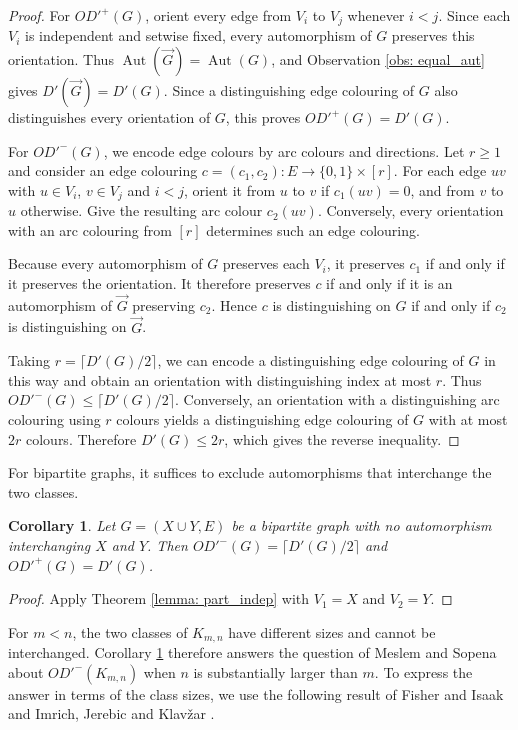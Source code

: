 \documentclass[a4paper,12pt]{elsarticle}
\newtheorem{corollary}[theorem]{Corollary}
\newcommand{\Aut}{\ensuremath{\operatorname{Aut}}}
\newcommand{\orG}{\ensuremath{\overrightarrow{G}}}
\begin{document}
\begin{proof}
For $OD'^+(G)$, orient every edge from $V_i$ to $V_j$ whenever $i<j$. Since each $V_i$ is independent and setwise fixed, every automorphism of $G$ preserves this orientation. Thus $\Aut(\orG)=\Aut(G)$, and Observation \ref{obs: equal_aut} gives $D'(\orG)=D'(G)$. Since a distinguishing edge colouring of $G$ also distinguishes every orientation of $G$, this proves $OD'^+(G)=D'(G)$.

For $OD'^-(G)$, we encode edge colours by arc colours and directions. Let $r\geq 1$ and consider an edge colouring $c=(c_1,c_2)\colon E\to\{0,1\}\times[r]$. For each edge $uv$ with $u\in V_i$, $v\in V_j$ and $i<j$, orient it from $u$ to $v$ if $c_1(uv)=0$, and from $v$ to $u$ otherwise. Give the resulting arc colour $c_2(uv)$. Conversely, every orientation with an arc colouring from $[r]$ determines such an edge colouring.

Because every automorphism of $G$ preserves each $V_i$, it preserves $c_1$ if and only if it preserves the orientation. It therefore preserves $c$ if and only if it is an automorphism of $\orG$ preserving $c_2$. Hence $c$ is distinguishing on $G$ if and only if $c_2$ is distinguishing on $\orG$.

Taking $r=\lceil D'(G)/2\rceil$, we can encode a distinguishing edge colouring of $G$ in this way and obtain an orientation with distinguishing index at most $r$. Thus $OD'^-(G)\leq\lceil D'(G)/2\rceil$. Conversely, an orientation with a distinguishing arc colouring using $r$ colours yields a distinguishing edge colouring of $G$ with at most $2r$ colours. Therefore $D'(G)\leq 2r$, which gives the reverse inequality.
\end{proof}

For bipartite graphs, it suffices to exclude automorphisms that interchange the two classes.

\begin{corollary} \label{cor: bipartite}
Let $G=(X\cup Y,E)$ be a bipartite graph with no automorphism interchanging $X$ and $Y$. Then $OD'^-(G)=\lceil D'(G)/2\rceil$ and $OD'^+(G)=D'(G)$.
\end{corollary}
\begin{proof}
Apply Theorem \ref{lemma: part_indep} with $V_1=X$ and $V_2=Y$.
\end{proof}

For $m<n$, the two classes of $K_{m,n}$ have different sizes and cannot be interchanged. Corollary \ref{cor: bipartite} therefore answers the question of Meslem and Sopena \cite{MeslemSopena} about $OD'^-(K_{m,n})$ when $n$ is substantially larger than $m$. To express the answer in terms of the class sizes, we use the following result of Fisher and Isaak \cite{FisherIsaak} and Imrich, Jerebic and Klav{\v{z}}ar \cite{ijk}.
\end{document}
